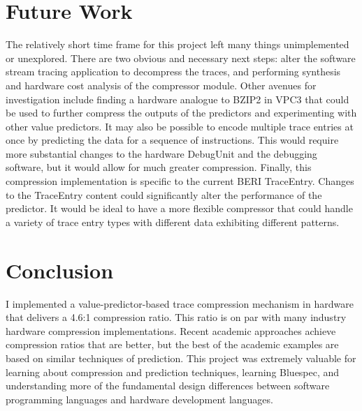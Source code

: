 \documentclass[conference]{IEEEtran}
\begin{document}
\section{Future Work}
The relatively short time frame for this project left many things unimplemented or unexplored. There are two obvious and necessary next steps: alter the software stream tracing application to decompress the traces, and performing synthesis and hardware cost analysis of the compressor module. Other avenues for investigation include finding a hardware analogue to BZIP2 in VPC3 that could be used to further compress the outputs of the predictors and experimenting with other value predictors. It may also be possible to encode multiple trace entries at once by predicting the data for a sequence of instructions. This would require more substantial changes to the hardware DebugUnit and the debugging software, but it would allow for much greater compression. Finally, this compression implementation is specific to the current BERI TraceEntry. Changes to the TraceEntry content could significantly alter the performance of the predictor. It would be ideal to have a more flexible compressor that could handle a variety of trace entry types with different data exhibiting different patterns.

\section{Conclusion}
I implemented a value-predictor-based trace compression mechanism in hardware that delivers a 4.6:1 compression ratio. This ratio is on par with many industry hardware compression implementations. Recent academic approaches achieve compression ratios that are better, but the best of the academic examples are based on similar techniques of prediction. This project was extremely valuable for learning about compression and prediction techniques, learning Bluespec, and understanding more of the fundamental design differences between software programming languages and hardware development languages. 









\end{document}

